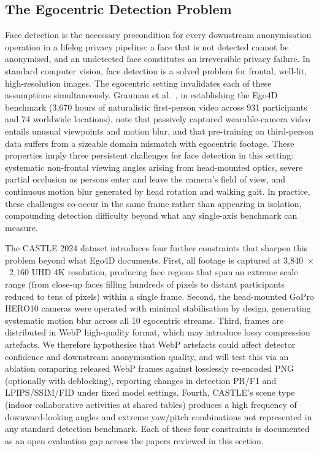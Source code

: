 \documentclass[12pt, onecolumn]{IEEEtran}
\begin{document}
\subsection{The Egocentric Detection Problem}

Face detection is the necessary precondition for every downstream anonymisation operation in a lifelog privacy
pipeline: a face that is not detected cannot be anonymised, and an undetected face constitutes an irreversible
privacy failure. In standard computer vision, face detection is a solved problem for frontal, well-lit,
high-resolution images. The egocentric setting invalidates each of these assumptions simultaneously. Grauman
et al.\ \cite{grauman2022ego4d}, in establishing the Ego4D benchmark (3,670 hours of naturalistic first-person video across
931 participants and 74 worldwide locations), note that passively captured wearable-camera video entails
unusual viewpoints and motion blur, and that pre-training on third-person data suffers from a sizeable
domain mismatch with egocentric footage. These properties imply three persistent challenges for face
detection in this setting: systematic non-frontal viewing angles arising from head-mounted optics, severe
partial occlusion as persons enter and leave the camera's field of view, and continuous motion blur generated
by head rotation and walking gait. In practice, these challenges co-occur in the same frame rather than
appearing in isolation, compounding detection difficulty beyond what any single-axis benchmark can measure.

The CASTLE 2024 dataset \cite{rossetto2025castle} introduces four further constraints that sharpen this problem beyond what Ego4D
documents. First, all footage is captured at 3,840~$\times$~2,160 UHD 4K resolution, producing face regions that
span an extreme scale range (from close-up faces filling hundreds of pixels to distant participants
reduced to tens of pixels) within a single frame. Second, the head-mounted GoPro HERO10 cameras were
operated with minimal stabilisation by design, generating systematic motion blur across all 10 egocentric
streams. Third, frames are distributed in WebP high-quality format, which may introduce lossy compression artefacts. We therefore hypothesise that WebP artefacts could affect detector confidence and downstream anonymisation quality, and will test this via an ablation comparing released WebP frames against losslessly re-encoded PNG (optionally with deblocking), reporting changes in detection PR/F1 and LPIPS/SSIM/FID under fixed model settings.
Fourth, CASTLE's scene type (indoor collaborative activities at shared tables) produces a high frequency
of downward-looking angles and extreme yaw/pitch combinations not represented in any standard detection
benchmark. Each of these four constraints is documented as an open evaluation gap across the papers reviewed
in this section.
\end{document}
